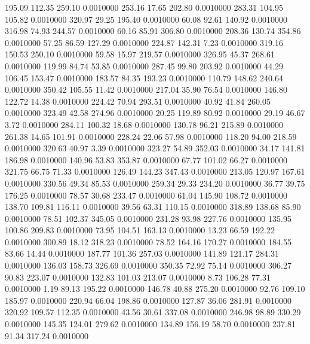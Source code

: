  195.09  112.35  259.10   0.0010000
 253.16   17.65  202.80   0.0010000
 283.31  104.95  105.82   0.0010000
 320.97   29.25  195.40   0.0010000
  60.08   92.61  140.92   0.0010000
 316.98   74.93  244.57   0.0010000
  60.16   85.91  306.80   0.0010000
 208.36  130.74  354.86   0.0010000
  57.25   86.59  127.29   0.0010000
 224.87  142.31    7.23   0.0010000
 319.16  150.53  250.10   0.0010000
  59.58   15.97  219.57   0.0010000
 326.95   45.37  268.61   0.0010000
 119.99   84.74   53.85   0.0010000
 287.45   99.80  203.92   0.0010000
  44.29  106.45  153.47   0.0010000
 183.57   84.35  193.23   0.0010000
 110.79  148.62  240.64   0.0010000
 350.42  105.55   11.42   0.0010000
 217.04   35.90   76.54   0.0010000
 146.80  122.72   14.38   0.0010000
 224.42   70.94  293.51   0.0010000
  40.92   41.84  260.05   0.0010000
 323.49   42.58  274.96   0.0010000
  20.25  119.89   80.92   0.0010000
  29.19   46.67    3.72   0.0010000
 284.11  100.32   18.68   0.0010000
 130.78   96.21  215.89   0.0010000
 261.38   14.65  101.91   0.0010000
 228.24   22.06   57.98   0.0010000
 118.20   94.00  218.59   0.0010000
 320.63   40.97    3.39   0.0010000
 323.27   54.89  352.03   0.0010000
  34.17  141.81  186.98   0.0010000
 140.96   53.83  353.87   0.0010000
  67.77  101.02   66.27   0.0010000
 321.75   66.75   71.33   0.0010000
 126.49  144.23  347.43   0.0010000
 213.05  120.97  167.61   0.0010000
 330.56   49.34   85.53   0.0010000
 259.34   29.33  234.20   0.0010000
  36.77   39.75  176.25   0.0010000
  78.57   30.68  233.47   0.0010000
  61.04  145.90  108.72   0.0010000
 138.70  109.81  116.11   0.0010000
  39.56   63.31  110.15   0.0010000
 318.89  138.68   85.90   0.0010000
  78.51  102.37  345.05   0.0010000
 231.28   93.98  227.76   0.0010000
 135.95  100.86  209.83   0.0010000
  73.95  104.51  163.13   0.0010000
  13.23   66.59  192.22   0.0010000
 300.89   18.12  318.23   0.0010000
  78.52  164.16  170.27   0.0010000
 184.55   83.66   14.44   0.0010000
 187.77  101.36  257.03   0.0010000
 141.89  121.17  284.31   0.0010000
 136.03  158.73  326.69   0.0010000
 350.35   72.92   75.14   0.0010000
 306.27   90.83  223.07   0.0010000
 132.83  101.03  213.07   0.0010000
   8.73  106.28   77.31   0.0010000
   1.19   89.13  195.22   0.0010000
 146.78   40.88  275.20   0.0010000
  92.76  109.10  185.97   0.0010000
 220.94   66.04  198.86   0.0010000
 127.87   36.06  281.91   0.0010000
 320.92  109.57  112.35   0.0010000
  43.56   30.61  337.08   0.0010000
 246.98   98.89  330.29   0.0010000
 145.35  124.01  279.62   0.0010000
 134.89  156.19   58.70   0.0010000
 237.81   91.34  317.24   0.0010000
